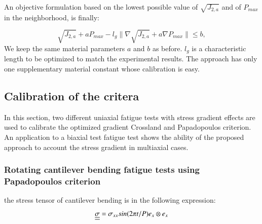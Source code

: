 \documentclass[3p,times,procedia,number]{elsarticle}
\begin{document}
An objective formulation based on the lowest possible value of $\sqrt{J_{2,a}}$ and of $P_{max}$ in the neighborhood, is finally:

\begin{equation}
\sqrt{J_{2,a}}+aP_{max}-l_g\parallel{\nabla\sqrt{J_{2,a}}}+a\nabla{P_{max}}\parallel\leqslant b ,
\label{modified Crossland}
\end{equation}
We keep the same material parameters $a$ and $b$ as before. $l_g$ is a characteristic length to be optimized to match the experimental results. The approach has only one supplementary material constant whose calibration is easy.


\subsection{Calibration of the critera}

In this section, two different uniaxial fatigue tests with stress gradient effects are used to calibrate the optimized gradient Crossland  and Papadopoulos criterion. An application to a biaxial test fatigue test shows the ability of the proposed approach to account the stress gradient in multiaxial cases. 
\subsubsection{Rotating cantilever bending fatigue tests using Papadopoulos criterion}  
the stress tensor of cantilever bending is in the following expression:
$$\uline{\uline{\sigma}}=\sigma_{xx}sin(2\pi t/P)e_x\otimes e_x$$
\end{document}
